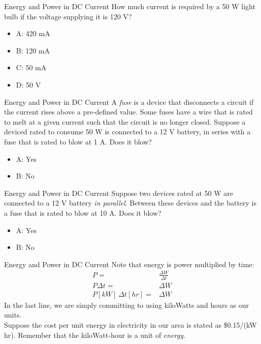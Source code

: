 \documentclass{beamer}
\begin{document}
\begin{frame}{Energy and Power in DC Current}
How much current is required by a 50 W light bulb if the voltage supplying it is 120 V?
\begin{itemize}
\item A: 420 mA
\item B: 120 mA
\item C: 50 mA
\item D: 50 V
\end{itemize}
\end{frame}

\begin{frame}{Energy and Power in DC Current}
A \textit{fuse} is a device that disconnects a circuit if the current rises above a pre-defined value.  Some fuses have a wire that is rated to melt at a given current such that the circuit is no longer closed.  Suppose a deviced rated to consume 50 W is connected to a 12 V battery, in series with a fuse that is rated to blow at 1 A.  Does it blow?
\begin{itemize}
\item A: Yes
\item B: No
\end{itemize}
\end{frame}

\begin{frame}{Energy and Power in DC Current}
Suppose two devices rated at 50 W are connected to a 12 V battery \textit{in parallel}.  Between these devices and the battery is a fuse that is rated to blow at 10 A.  Does it blow?
\begin{itemize}
\item A: Yes
\item B: No
\end{itemize}
\end{frame}

\begin{frame}{Energy and Power in DC Current}
Note that energy is power multiplied by time:
\begin{align}
P =& \frac{\Delta W}{\Delta t} \\
P \Delta t =& \Delta W \\
P[kW] ~ \Delta t[hr] =& \Delta W
\end{align}
In the last line, we are simply committing to using kiloWatts and hours as our units. \\ \vspace{0.5cm}
Suppose the cost per unit energy in electricity in our area is stated as \$0.15/(kW hr).  Remember that the kiloWatt-hour is a unit of \textit{energy.}
\end{frame}
\end{document}
